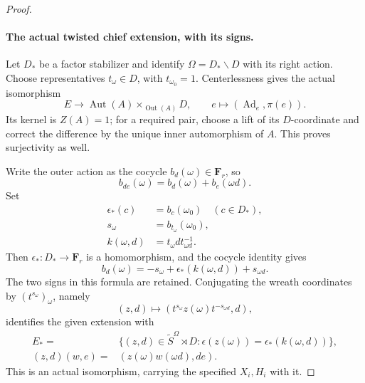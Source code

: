 \begin{proof}
\paragraph{The actual twisted chief extension, with its signs.}
Let \(D_*\) be a factor stabilizer and identify
\(\Omega=D_*\backslash D\) with its right action.
Choose representatives \(t_\omega\in D\), with
\(t_{\omega_0}=1\). Centerlessness gives the actual
isomorphism
\[
 E\longrightarrow
       \operatorname{Aut}(A)
           \mathbin{\times_{\operatorname{Out}(A)}}D,
       \qquad e\longmapsto(\operatorname{Ad}_e,\pi(e)).
 \tag{D.45.16}
\]
Its kernel is \(Z(A)=1\); for a required pair,
choose a lift of its \(D\)-coordinate and correct
the difference by the unique inner automorphism
of \(A\). This proves surjectivity as well.

Write the outer action as the cocycle
\(b_d(\omega)\in\mathbf F_r\), so
\[
 b_{de}(\omega)=b_d(\omega)+b_e(\omega d).
 \tag{D.45.17}
\]
Set
\[
 \begin{split}
 \epsilon_*(c)&=b_c(\omega_0)\quad(c\in D_*),\\
 s_\omega&=b_{t_\omega}(\omega_0),\\
 k(\omega,d)&=t_\omega d t_{\omega d}^{-1}.
 \end{split}
 \tag{D.45.18}
\]
Then \(\epsilon_*:D_*\to\mathbf F_r\) is a
homomorphism, and the cocycle identity gives
\[
           b_d(\omega)=-s_\omega+
                      \epsilon_*(k(\omega,d))+s_{\omega d}.
 \tag{D.45.19}
\]
The two signs in this formula are retained.
Conjugating the wreath coordinates by
\((t^{s_\omega})_\omega\), namely
\[
          (z,d)\longmapsto
       (t^{s_\omega}z(\omega)t^{-s_{\omega d}},d),
 \tag{D.45.20}
\]
identifies the given extension with
\[
 \begin{split}
 E_*={}&\{(z,d)\in\widetilde S^\Omega\rtimes D:
          \epsilon(z(\omega))=\epsilon_*(k(\omega,d))\},\\
 (z,d)(w,e)={}&(z(\omega)w(\omega d),de).
 \end{split}
 \tag{D.45.21}
\]
This is an actual isomorphism, carrying the specified
\(X_i,H_i\) with it.


\end{proof}
